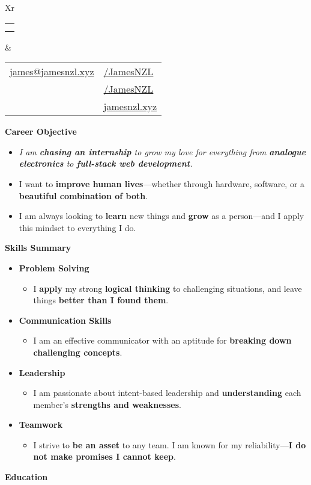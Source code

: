 \documentclass[11pt,a4paper]{article}[leftmargin=*]
\makeatletter
\def \fullname {James Bao}
\def \subtitle {}
\def \emailicon {\faAt}
\def \emaillink {mailto:james@jamesnzl.xyz}
\def \emailtext {james@jamesnzl.xyz}
\def \phoneicon {\faMobile}
\def \phonetext {+64 22 410 1580}
\def \addressicon {\faMapMarker*}
\def \addresstext {Auckland, New Zealand}
\def \linkedinicon {\faLinkedin}
\def \linkedinlink {https://www.linkedin.com/in/jamesnzl/}
\def \linkedintext {/JamesNZL}
\def \githubicon {\faGithub}
\def \githublink {https://github.com/jamesnzl}
\def \githubtext {/JamesNZL}
\def \websiteicon {\faGlobe}
\def \websitelink {https://jamesnzl.xyz/}
\def \websitetext {jamesnzl.xyz}
\def \headertype {\doublecol} %
\def \entryspacing {-0pt}
\def \bulletstylei {\faAngleRight\hspace{-4.5pt}}
\def \email {\emailicon \hspace{3pt}\href{\emaillink}{\emailtext}}
\def \phone {\phoneicon \hspace{3pt}{ \phonetext}}
\def \address {\addressicon \hspace{3pt}{\addresstext}}
\def \linkedin {\linkedinicon \hspace{3pt}\href{\linkedinlink}{\linkedintext}}
\def \github {\githubicon \hspace{3pt}\href{\githublink}{\githubtext}}
\def \website {\websiteicon \hspace{3pt}\href{\websitelink}{\websitetext}}
\renewcommand{\section}[2]{\vspace{5pt}
  \colorbox{secondary}{\color{white}\raggedbottom\normalsize\textbf{{#1}{\hspace{2pt}#2\hspace{4pt}}}}
}
\newcommand{\resumeEntryStart}{\begin{itemize}[leftmargin=2.5mm]}
\newcommand{\resumeEntryEnd}{\end{itemize}\vspace{\entryspacing}}
\newcommand{\resumeItemListStart}{\begin{itemize}[leftmargin=4.5mm]}
\newcommand{\resumeItemListEnd}{\end{itemize}}
\newcommand{\resumeItem}[2][\bulletstylei]{
  \item[\small#1]\small{
    {#2 \vspace{-2pt}}
  }
}
\newcommand{\resumeEntryS}[2]{
  \item[]\small{
    \textbf{\color{primary}#1 }{ #2 \vspace{-4pt}}
  }
}
\newcommand{\resumeEntryE}[1]{
  \item[]\small{
    \resumeIt{\small#1 \vspace{-4pt}}
  }\\
}
\newcommand{\resumeEntryP}[1]{
  \item[]\small{
    #1 \vspace{-4pt}
  }\\
}
\newcommand{\resumeIt}[1]{\textit{\color{accent}#1}}
\newcommand{\resumeBf}[1]{\small\textbf{\color{halfbold}#1}}
\newcommand{\doublecol}[6]{
  \begin{tabularx}{\textwidth}{Xr}
    {
      \begin{tabular}[c]{l}
        \fontsize{35}{45}\selectfont{\color{primary}{{\textbf{\fullname}}}} \\
        {\textit{\subtitle}} %
      \end{tabular}
    } & {
      \begin{tabular}[c]{l@{\hspace{1.5em}}l}
        {\small#4} & {\small#1} \\
        {\small#5} & {\small#2} \\
        {\small#6} & {\small#3}
      \end{tabular}
    }
  \end{tabularx}
}
\newcommand{\singlecol}[6]{
  \begin{tabularx}{\textwidth}{Xr}
    {
      \begin{tabular}[b]{l}
        \fontsize{35}{45}\selectfont{\color{primary}{{\textbf{\fullname}}}} \\
        {\textit{\subtitle}} %
      \end{tabular}
    } & {
      \begin{tabular}[c]{l}
        {\small#1} \\
        {\small#2} \\
        {\small#3} \\
        {\small#4} \\
        {\small#5} \\
        {\small#6}
      \end{tabular}
    }
  \end{tabularx}
}
\makeatother
\begin{document}

\headertype{\linkedin}{\github}{\website}{\email}{\phone}{\address} %
\vspace{-10pt} %


\section{\faCrosshairs}{Career Objective}

\resumeEntryStart
\resumeEntryE{I am \resumeBf{chasing an internship} to grow my love for everything from \resumeBf{analogue electronics} to \resumeBf{full-stack web development}.}

\resumeEntryP{I want to \resumeBf{improve human lives}---whether through hardware, software, or a \resumeBf{beautiful combination of both}.}

\resumeEntryP{I am always looking to \resumeBf{learn} new things and \resumeBf{grow} as a person—and I apply this mindset to everything I do.}
\resumeEntryEnd


\section{\faAngleDoubleUp}{Skills Summary}

\resumeEntryStart
\resumeEntryS{Problem Solving}{}
\resumeItemListStart
\resumeItem{
  I \resumeBf{apply} my strong \resumeBf{logical thinking} to challenging situations, and leave things \resumeBf{better than I found them}.
}
\resumeItemListEnd

\resumeEntryS{Communication Skills}{}
\resumeItemListStart
\resumeItem{
  I am an effective communicator with an aptitude for \resumeBf{breaking down challenging concepts}.
}
\resumeItemListEnd

\resumeEntryS{Leadership}{}
\resumeItemListStart
\resumeItem{
  I am passionate about intent-based leadership and \resumeBf{understanding} each member's \resumeBf{strengths and weaknesses}.
}
\resumeItemListEnd

\resumeEntryS{Teamwork}{}
\resumeItemListStart
\resumeItem{
  I strive to \resumeBf{be an asset} to any team. I am known for my reliability---\resumeBf{I do not make promises I cannot keep}.
}
\resumeItemListEnd
\resumeEntryEnd

\section{\faGraduationCap}{Education}
\end{document}

